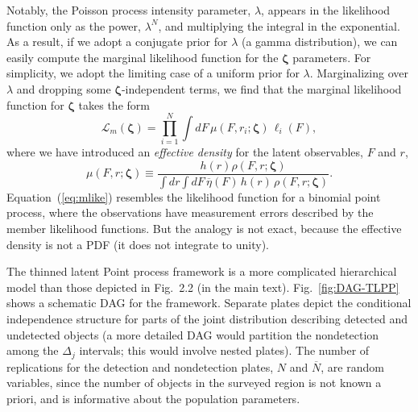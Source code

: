 \documentclass[12pt]{article}
\numberwithin{equation}{section}
\numberwithin{figure}{section}
\numberwithin{table}{section}
\newcommand{\rhopar}{\boldsymbol{\zeta}}
\newcommand{\aeffic}{\overline{\eta}}
\newcommand{\like}{\mathcal{L}}
\newcommand{\epdf}{\mu}
\begin{document}
Notably, the Poisson process intensity parameter, $\lambda$, appears in the likelihood function only as the power, $\lambda^N$, and multiplying the integral in the exponential.
As a result, if we adopt a conjugate prior for $\lambda$ (a gamma distribution), we can easily compute the marginal likelihood function for the $\rhopar$ parameters.
For simplicity, we adopt the limiting case of a uniform prior for $\lambda$.
Marginalizing over $\lambda$ and dropping some $\rhopar$-independent terms, we find that the marginal likelihood function for $\rhopar$ takes the form
\begin{equation}\label{eq:mlike}
\like_m(\rhopar)
  = \prod_{i=1}^N \int dF\, \epdf(F,r_i;\rhopar)\, \ell_i(F),
\end{equation}
where we have introduced an \emph{effective density} for the latent observables, $F$ and $r$,
\begin{equation}\label{eq:epdf}
\epdf(F,r;\rhopar) \equiv
  \frac{h(r) \rho(F,r;\rhopar)}
    {\int dr \int dF\,\aeffic(F)\, h(r)\, \rho(F,r;\rhopar)}.
\end{equation}
Equation~(\ref{eq:mlike}) resembles the likelihood function for a binomial point process, where the observations have measurement errors described by the member likelihood functions.
But the analogy is not exact, because the effective density is not a PDF (it does not integrate to unity).

The thinned latent Point process framework is a more complicated hierarchical model than those depicted in Fig.~2.2 (in the main text).
Fig.~\ref{fig:DAG-TLPP} shows a schematic DAG for the framework.
Separate plates depict the conditional independence structure for parts of the joint distribution describing detected and undetected objects (a more detailed DAG would partition the nondetection among the $\Delta_j$ intervals; this would involve nested plates).
The number of replications for the detection and nondetection plates, $N$ and $\overline{N}$, are random variables, since the number of objects in the surveyed region is not known a priori, and is informative about the population parameters.
\end{document}
